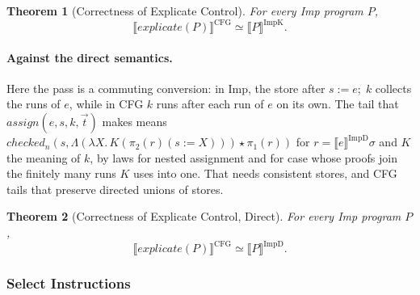 \documentclass[10pt]{article}
\theoremstyle{acmplain}
\newtheorem{theorem}{Theorem}[section]
\newcommand{\SEM}[1]{\llbracket #1 \rrbracket}
\newcommand{\pass}[1]{\mathit{#1}}
\newcommand{\ext}[3]{#1(#2{:=}#3)}
\newcommand{\app}{\star}
\newcommand{\assign}[3]{#1 \mathrel{:=} #2;\; #3}
\begin{document}
\begin{theorem}[Correctness of Explicate Control]\label{thm:explicate}
For every Imp program $P$,
\[
  \SEM{\pass{explicate}(P)}^{\mathrm{CFG}} \simeq \SEM{P}^{\mathrm{ImpK}} .
\]
\end{theorem}

\paragraph{Against the direct semantics.}
Here the pass is a commuting conversion: in Imp, the store after
$\assign{s}{e}{k}$ collects the runs of $e$, while in CFG $k$ runs after
each run of $e$ on its own. The tail that $\pass{assign}(e, s, k, \vec{t})$
makes means
$\mathit{checked}_n(s, \Lambda(\lambda X.\, K(\ext{\pi_2(r)}{s}{X})) \app \pi_1(r))$
for $r = \SEM{e}^{\mathrm{ImpD}}\sigma$ and $K$ the meaning of $k$,
by laws for nested assignment and for case whose proofs join the
finitely many runs $K$ uses into one. That needs consistent stores, and
CFG tails that preserve directed unions of stores.

\begin{theorem}[Correctness of Explicate Control, Direct]\label{thm:explicate-d}
For every Imp program $P$,
\[
  \SEM{\pass{explicate}(P)}^{\mathrm{CFG}} \simeq \SEM{P}^{\mathrm{ImpD}} .
\]
\end{theorem}

\subsubsection{Select Instructions}\label{sec:den-select}
\end{document}
